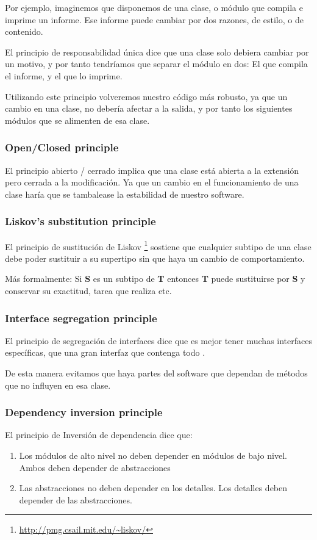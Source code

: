 Por ejemplo, imaginemos que disponemos de una clase, o m\'{o}dulo que compila e imprime un informe. 
Ese informe puede cambiar por dos razones, de estilo, o de contenido. 

El principio de responsabilidad \'{u}nica dice que una clase solo debiera cambiar por un motivo, y por 
tanto tendr\'{i}amos que separar el m\'{o}dulo en dos: El que compila el informe, y el que lo imprime.

Utilizando este principio volveremos nuestro c\'{o}digo m\'as robusto, ya que un cambio en una clase, no 
deber\'{i}a afectar a la salida, y por tanto los siguientes m\'{o}dulos que se alimenten de esa clase.

\subsubsection{Open/Closed principle}
El principio abierto / cerrado \cite{SOLID:OCP} implica que una clase est\'{a} abierta a la extensi\'{o}n pero cerrada a la modificaci\'{o}n. Ya que un cambio en el
funcionamiento de una clase har\'{i}a que se tambalease la estabilidad de nuestro software.

\subsubsection{Liskov's substitution principle}
El principio de sustituci\'{o}n de Liskov \cite{SOLID:LSP} \footnote{\url{http://pmg.csail.mit.edu/~liskov/}} 
sostiene que cualquier subtipo de una clase
debe poder sustituir a su supertipo sin que haya un cambio de comportamiento.

M\'{a}s formalmente: Si \textbf{S} es un subtipo de \textbf{T} entonces \textbf{T} puede sustituirse por \textbf{S} y 
conservar su exactitud, tarea que realiza etc.

\subsubsection{Interface segregation principle}
El principio de segregaci\'{o}n de interfaces dice que es mejor tener muchas interfaces espec\'{i}ficas, 
que una gran interfaz que contenga todo \cite{SOLID:ISP}.

De esta manera evitamos que haya partes del software que dependan de m\'{e}todos que no influyen en esa clase.

\subsubsection{Dependency inversion principle}
El principio de Inversi\'{o}n de dependencia dice que:
\begin{enumerate}
    \item Los m\'{o}dulos de alto nivel no deben depender en m\'{o}dulos de bajo nivel. Ambos deben depender de abstracciones
    \item Las abstracciones no deben depender en los detalles. Los detalles deben depender de las abstracciones.
\end{enumerate}
\cite{SOLID:DIP}

